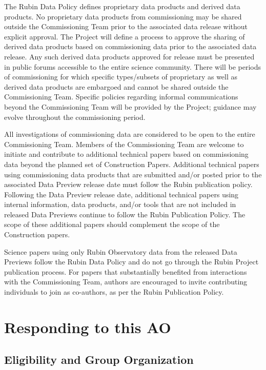 \documentclass[SE,authoryear,toc]{lsstdoc}
\begin{document}
The Rubin Data Policy  defines proprietary data products and derived data products. No proprietary data products from commissioning may be shared outside the Commissioning Team prior to the associated data release without explicit approval. The Project will define a process to approve the sharing of derived data products based on commissioning data prior to the associated data release. Any such derived data products approved for release must be presented in public forums accessible to the entire science community. There will be periods of commissioning for which specific types/subsets of proprietary as well as derived data products are embargoed and cannot be shared outside the Commissioning Team. Specific policies regarding informal communications beyond the Commissioning Team will be provided by the Project; guidance may evolve throughout the commissioning period. 

All investigations of commissioning data are considered to be open to the entire Commissioning Team. Members of the Commissioning Team are welcome to initiate and contribute to additional technical papers based on commissioning data beyond the planned set of Construction Papers. Additional technical papers using commissioning data products that are submitted and/or posted prior to the associated Data Preview release date must follow the Rubin publication policy. Following the Data Preview release date, additional technical papers using internal information, data products, and/or tools that are not included in released Data Previews continue to follow the Rubin Publication Policy. The scope of these additional papers should complement the scope of the Construction papers.

Science papers using only Rubin Observatory data from the released Data Previews follow the Rubin Data Policy  and do not go through the Rubin Project publication process. For papers that substantially benefited from interactions with the Commissioning Team, authors are encouraged to invite contributing individuals to join as co-authors, as per the Rubin Publication Policy.

\section{Responding to this AO}
\label{loi}

\subsection{Eligibility and Group Organization}
\label{eligibility}
\end{document}
